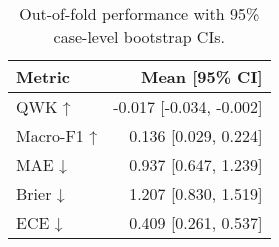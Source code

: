 \begin{table}
\caption{Out-of-fold performance with 95\% case-level bootstrap CIs.}
\label{tab:oof-performance}
\begin{tabular}{lr}
\toprule
Metric & Mean [95\% CI] \\
\midrule
QWK ↑ & -0.017 [-0.034, -0.002] \\
Macro-F1 ↑ & 0.136 [0.029, 0.224] \\
MAE ↓ & 0.937 [0.647, 1.239] \\
Brier ↓ & 1.207 [0.830, 1.519] \\
ECE ↓ & 0.409 [0.261, 0.537] \\
\bottomrule
\end{tabular}
\end{table}
